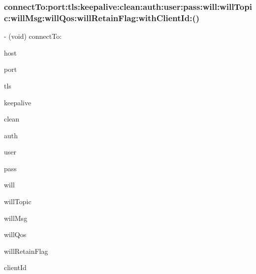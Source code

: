 \subsubsection{\texorpdfstring{connect\+To\+:port\+:tls\+:keepalive\+:clean\+:auth\+:user\+:pass\+:will\+:will\+Topic\+:will\+Msg\+:will\+Qos\+:will\+Retain\+Flag\+:with\+Client\+Id\+:()}{connectTo:port:tls:keepalive:clean:auth:user:pass:will:willTopic:willMsg:willQos:willRetainFlag:withClientId:()}}
{\footnotesize\ttfamily -\/ (void) connect\+To\+: \begin{DoxyParamCaption}\item[{(N\+S\+String $\ast$)}]{host }\item[{port:(N\+S\+Integer)}]{port }\item[{tls:(B\+O\+OL)}]{tls }\item[{keepalive:(N\+S\+Integer)}]{keepalive }\item[{clean:(B\+O\+OL)}]{clean }\item[{auth:(B\+O\+OL)}]{auth }\item[{user:(N\+S\+String $\ast$)}]{user }\item[{pass:(N\+S\+String $\ast$)}]{pass }\item[{will:(B\+O\+OL)}]{will }\item[{willTopic:(N\+S\+String $\ast$)}]{will\+Topic }\item[{willMsg:(N\+S\+Data $\ast$)}]{will\+Msg }\item[{willQos:(M\+Q\+T\+T\+Qos\+Level)}]{will\+Qos }\item[{willRetainFlag:(B\+O\+OL)}]{will\+Retain\+Flag }\item[{withClientId:(N\+S\+String $\ast$)}]{client\+Id }\end{DoxyParamCaption}}

